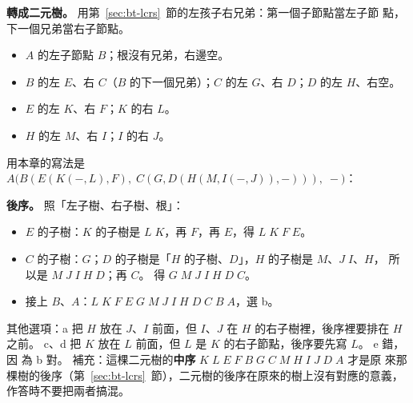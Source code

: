 \textbf{轉成二元樹。} 用第~\ref{sec:bt-lcrs}~節的左孩子右兄弟：第一個子節點當左子節
點，下一個兄弟當右子節點。
\begin{itemize}
\item $A$ 的左子節點 $B$；根沒有兄弟，右邊空。
\item $B$ 的左 $E$、右 $C$（$B$ 的下一個兄弟）；$C$ 的左 $G$、右 $D$；$D$ 的左 $H$、右空。
\item $E$ 的左 $K$、右 $F$；$K$ 的右 $L$。
\item $H$ 的左 $M$、右 $I$；$I$ 的右 $J$。
\end{itemize}
用本章的寫法是
$A\bigl(B(E(K(-, L), F),\; C(G, D(H(M, I(-, J)), -))),\; -\bigr)$：

\begin{center}
\end{center}

\textbf{後序。} 照「左子樹、右子樹、根」：
\begin{itemize}
\item $E$ 的子樹：$K$ 的子樹是 $L\;K$，再 $F$，再 $E$，得 $L\;K\;F\;E$。
\item $C$ 的子樹：$G$；$D$ 的子樹是「$H$ 的子樹、$D$」，$H$ 的子樹是 $M$、$J\;I$、$H$，
所以是 $M\;J\;I\;H\;D$；再 $C$。 得 $G\;M\;J\;I\;H\;D\;C$。
\item 接上 $B$、$A$：$L\;K\;F\;E\;G\;M\;J\;I\;H\;D\;C\;B\;A$，選 b。
\end{itemize}

其他選項：a 把 $H$ 放在 $J$、$I$ 前面，但 $I$、$J$ 在 $H$ 的右子樹裡，後序裡要排在 $H$
之前。 c、d 把 $K$ 放在 $L$ 前面，但 $L$ 是 $K$ 的右子節點，後序要先寫 $L$。 e 錯，因
為 b 對。 補充：這棵二元樹的\textbf{中序} $K\;L\;E\;F\;B\;G\;C\;M\;H\;I\;J\;D\;A$ 才是原
來那棵樹的後序（第~\ref{sec:bt-lcrs}~節），二元樹的後序在原來的樹上沒有對應的意義，
作答時不要把兩者搞混。

